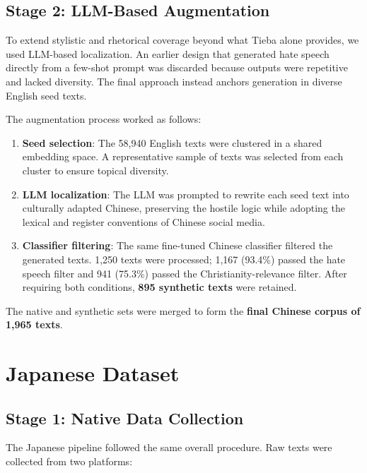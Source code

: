\documentclass[../CLthesis.tex]{subfiles}
\begin{document}
\subsection{Stage 2: LLM-Based Augmentation}
\label{subsec:zh-aug}

To extend stylistic and rhetorical coverage beyond what Tieba alone provides, we used LLM-based localization. An earlier design that generated hate speech directly from a few-shot prompt was discarded because outputs were repetitive and lacked diversity. The final approach instead anchors generation in diverse English seed texts.

The augmentation process worked as follows:
\begin{enumerate}
  \item \textbf{Seed selection}: The 58,940 English texts were clustered in a shared embedding space. A representative sample of texts was selected from each cluster to ensure topical diversity.
  \item \textbf{LLM localization}: The LLM was prompted to rewrite each seed text into culturally adapted Chinese, preserving the hostile logic while adopting the lexical and register conventions of Chinese social media.
  \item \textbf{Classifier filtering}: The same fine-tuned Chinese classifier filtered the generated texts. 1,250 texts were processed; 1,167 (93.4\%) passed the hate speech filter and 941 (75.3\%) passed the Christianity-relevance filter. After requiring both conditions, \textbf{895 synthetic texts} were retained.
\end{enumerate}

The native and synthetic sets were merged to form the \textbf{final Chinese corpus of 1,965 texts}.


\section{Japanese Dataset}
\label{sec:ja-data}

\subsection{Stage 1: Native Data Collection}
\label{subsec:ja-native}

The Japanese pipeline followed the same overall procedure. Raw texts were collected from two platforms:
\end{document}
